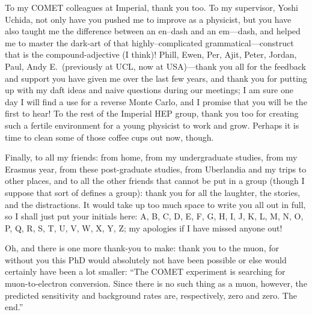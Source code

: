 \begin{acknowledgements}
To my COMET colleagues at Imperial, thank you too.
To my supervisor, Yoshi Uchida, not only have you pushed me to improve as a physicist, but you have also taught me the difference between an en--dash and an em---dash, and helped me to master the dark-art of that highly--complicated grammatical---construct that is the compound-adjective (I think)!
Phill, Ewen, Per, Ajit, Peter, Jordan, Paul, Andy E.\ (previously at UCL, now at USA)---thank you all for the feedback and support you have given me over the last few years, and thank you 
	for putting up with my daft ideas and naive questions during our meetings; I am sure one day I will find a use for a reverse Monte Carlo, and I promise that you will be the first to hear!
To the rest of the Imperial HEP group, thank you too for creating such a fertile environment for a young physicist to work and grow.
Perhaps it is time to clean some of those coffee cups out now, though.

Finally, to all my friends: from home, from my undergraduate studies, from my Erasmus year, from these post-graduate studies, from Uberlandia and my trips to other places, and to all the other friends that cannot be put in a group (though I suppose that sort of defines a group):
	thank you for all the laughter, the stories, and the distractions.
It would take up too much space to write you all out in full, so I shall just put your initials here:
A, B, C, D, E, F, G, H, I, J, K, L, M, N, O, P, Q, R, S, T, U, V, W, X, Y, Z;
my apologies if I have missed anyone out!

Oh, and there is one more thank-you to make: thank you to the muon, for without you this PhD would absolutely not have been possible or else would certainly have been a lot smaller:
``The COMET experiment is searching for muon-to-electron conversion. Since there is no such thing as a muon, however, the predicted sensitivity and background rates are, respectively, zero and zero.  The end.''

%
%



\end{acknowledgements}
